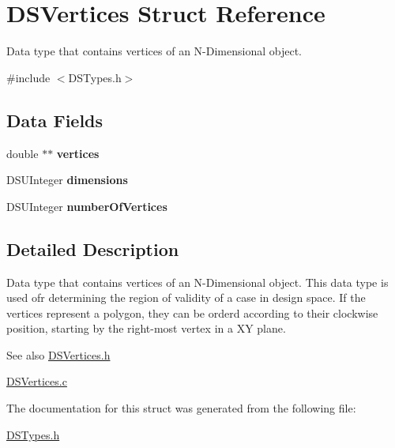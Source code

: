 \hypertarget{struct_d_s_vertices}{
\section{DSVertices Struct Reference}
\label{struct_d_s_vertices}
}


Data type that contains vertices of an N-\/Dimensional object.  




{\ttfamily \#include $<$DSTypes.h$>$}

\subsection*{Data Fields}
\begin{DoxyCompactItemize}
\item 
\hypertarget{struct_d_s_vertices_ac674f38f08f21a39a39f1d22819c095a}{
double $\ast$$\ast$ {\bfseries vertices}}
\label{struct_d_s_vertices_ac674f38f08f21a39a39f1d22819c095a}

\item 
\hypertarget{struct_d_s_vertices_a6fdc3a44329b983d1ca2de9e72bb5e23}{
DSUInteger {\bfseries dimensions}}
\label{struct_d_s_vertices_a6fdc3a44329b983d1ca2de9e72bb5e23}

\item 
\hypertarget{struct_d_s_vertices_a18928475edb2db23b57e96a0376d84c0}{
DSUInteger {\bfseries numberOfVertices}}
\label{struct_d_s_vertices_a18928475edb2db23b57e96a0376d84c0}

\end{DoxyCompactItemize}


\subsection{Detailed Description}
Data type that contains vertices of an N-\/Dimensional object. This data type is used ofr determining the region of validity of a case in design space. If the vertices represent a polygon, they can be orderd according to their clockwise position, starting by the right-\/most vertex in a XY plane.

\begin{DoxySeeAlso}{See also}
\hyperlink{_d_s_vertices_8h}{DSVertices.h} 

\hyperlink{_d_s_vertices_8c}{DSVertices.c} 
\end{DoxySeeAlso}


The documentation for this struct was generated from the following file:\begin{DoxyCompactItemize}
\item 
\hyperlink{_d_s_types_8h}{DSTypes.h}\end{DoxyCompactItemize}
